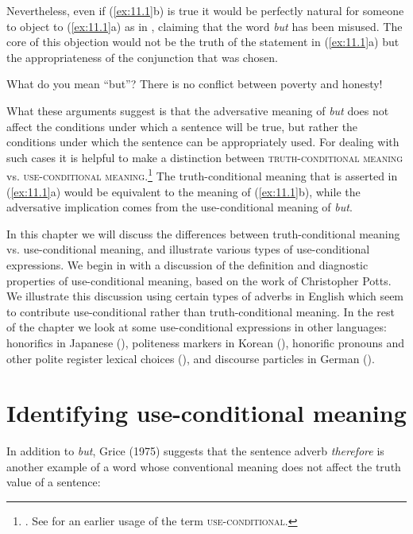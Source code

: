 Nevertheless, even if (\ref{ex:11.1}b) is true it would be perfectly natural for someone to object to (\ref{ex:11.1}a) as in , claiming that the word \textit{but} has been misused. The core of this objection would not be the truth of the statement in (\ref{ex:11.1}a) but the appropriateness of the conjunction that was chosen.


\ea \label{ex:11.2}
What do you mean “but”? There is no conflict between poverty and honesty!
\z


What these arguments suggest is that the adversative meaning of \textit{but} does not affect the conditions under which a sentence will be true, but rather the conditions under which the sentence can be appropriately used. For dealing with such cases it is helpful to make a distinction between \textsc{truth-conditional meaning} vs. \textsc{use-conditional meaning}.\footnote{\citet{Gutzmann2015}. See \citet{Recanati2004} for an earlier usage of the term \textsc{use-conditional}.} The truth-conditional meaning that is asserted in (\ref{ex:11.1}a) would be equivalent to the meaning of (\ref{ex:11.1}b), while the adversative implication comes from the use-conditional meaning of \textit{but}.



In this chapter we will discuss the differences between truth-conditional meaning vs. use-conditional meaning, and illustrate various types of use-conditional expressions. We begin in  with a discussion of the definition and diagnostic properties of use-conditional meaning, based on the work of Christopher Potts. We illustrate this discussion using certain types of adverbs in English which seem to contribute use-conditional rather than truth-conditional meaning. In the rest of the chapter we look at some use-conditional expressions in other languages: honorifics in {Japanese} (), politeness markers in {Korean} (), honorific pronouns and other polite register lexical choices (), and discourse particles in {German} ().


\section{Identifying use-conditional meaning}\label{sec:11.2}

In addition to \textit{but}, Grice (1975) suggests that the sentence adverb \textit{therefore} is another example of a word whose conventional meaning does not affect the truth value of a sentence:



